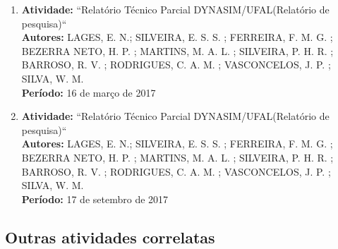 \documentclass[a4paper,oneside,10pt]{article}
\begin{document}
\begin{enumerate}   
\renewcommand{\labelenumi}{{\large\bfseries\arabic{enumi}.}}

\item   \textbf{Atividade:} ``Relatório Técnico Parcial DYNASIM/UFAL(Relatório de pesquisa)`` 
  \mbox{} \\
        \textbf{Autores:} LAGES, E. N.; SILVEIRA, E. S. S. ; FERREIRA, F. M. G. ; BEZERRA NETO, H. P. ; MARTINS, M. A. L. ; SILVEIRA, P. H. R. ; BARROSO, R. V. ; RODRIGUES, C. A. M. ; VASCONCELOS, J. P. ; SILVA, W. M. \\
        \textbf{Período:} 16 de março de 2017 \\
               
\item   \textbf{Atividade:} ``Relatório Técnico Parcial DYNASIM/UFAL(Relatório de pesquisa)`` 
  \mbox{} \\
        \textbf{Autores:} LAGES, E. N.; SILVEIRA, E. S. S. ; FERREIRA, F. M. G. ; BEZERRA NETO, H. P. ; MARTINS, M. A. L. ; SILVEIRA, P. H. R. ; BARROSO, R. V. ; RODRIGUES, C. A. M. ; VASCONCELOS, J. P. ; SILVA, W. M.\\
        \textbf{Período:} 17 de setembro de 2017 \\

           
\end{enumerate}          
        
\subsection{Outras atividades correlatas}
\vspace{0.3cm}
\end{document}
